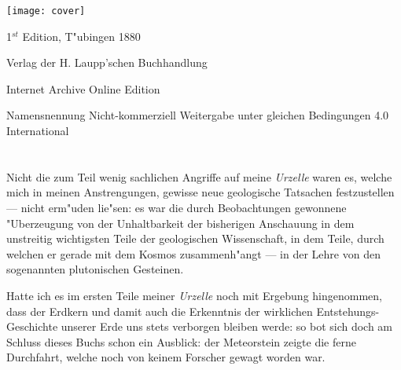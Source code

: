 \documentclass[a4paper, 11pt, oneside]{article}
\begin{document}
\begin{titlepage}
	\texttt{[image: cover]}
	
		
	\vspace*{\fill}%
	
	1$^{st}$ Edition, T"ubingen 1880 %
	
	{\small Verlag der H. Laupp'schen Buchhandlung } %

	\vspace{1\baselineskip} %

    Internet Archive Online Edition  %
	
	{\small Namensnennung Nicht-kommerziell Weitergabe unter gleichen Bedingungen 4.0 International } %
\end{titlepage}
\setlength{\parskip}{1mm plus1mm minus1mm}
\setcounter{tocdepth}{2}
\setcounter{secnumdepth}{3}
\tableofcontents
\clearpage
\listoffigures
\clearpage
\section{}
\subsection{}
\paragraph{}
Nicht die zum Teil wenig sachlichen Angriffe auf meine \emph{Urzelle} waren es, welche mich in meinen Anstrengungen, gewisse neue geologische Tatsachen festzustellen --- nicht erm"uden lie"sen: es war die durch Beobachtungen gewonnene "Uberzeugung von der Unhaltbarkeit der bisherigen Anschauung in dem unstreitig wichtigsten Teile der geologischen Wissenschaft, in dem Teile, durch welchen er gerade mit dem Kosmos zusammenh"angt --- in der Lehre von den sogenannten plutonischen Gesteinen.

Hatte ich es im ersten Teile meiner \emph{Urzelle} noch mit Ergebung hingenommen, dass der Erdkern und damit auch die Erkenntnis der wirklichen Entstehungs-Geschichte unserer Erde uns stets verborgen bleiben werde: so bot sich doch am Schluss dieses Buchs schon ein Ausblick: der Meteorstein zeigte die ferne Durchfahrt, welche noch von keinem Forscher gewagt worden war.
\end{document}
